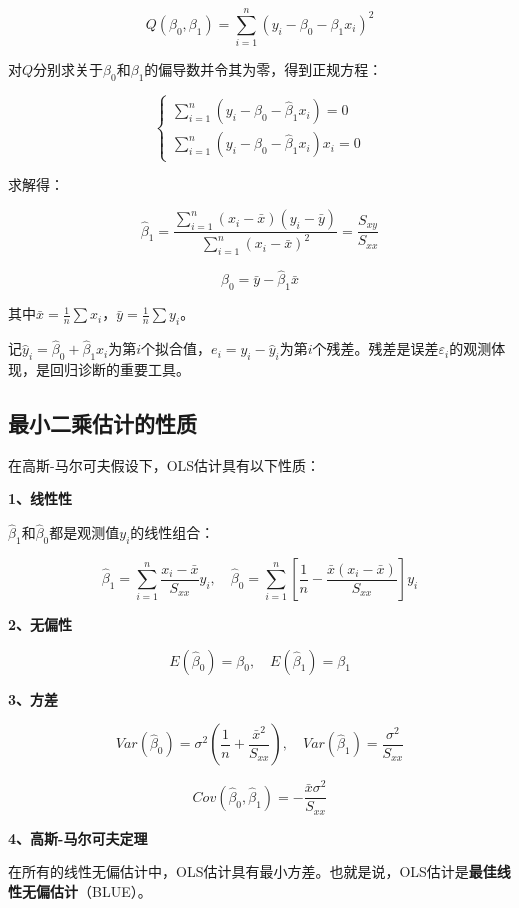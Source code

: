 \documentclass[
]{book}
\begin{document}
\[
Q(\beta_0, \beta_1) = \sum_{i=1}^n (y_i - \beta_0 - \beta_1 x_i)^2
\]

对\(Q\)分别求关于\(\beta_0\)和\(\beta_1\)的偏导数并令其为零，得到正规方程：

\[
\begin{cases}
\sum_{i=1}^n (y_i - \hat{\beta}_0 - \hat{\beta}_1 x_i) = 0 \\
\sum_{i=1}^n (y_i - \hat{\beta}_0 - \hat{\beta}_1 x_i) x_i = 0
\end{cases}
\]

求解得：

\[
\hat{\beta}_1 = \frac{\sum_{i=1}^n (x_i - \bar{x})(y_i - \bar{y})}{\sum_{i=1}^n (x_i - \bar{x})^2} = \frac{S_{xy}}{S_{xx}}
\]

\[
\hat{\beta}_0 = \bar{y} - \hat{\beta}_1 \bar{x}
\]

其中\(\bar{x} = \frac{1}{n}\sum x_i\)，\(\bar{y} = \frac{1}{n}\sum y_i\)。

记\(\hat{y}_i = \hat{\beta}_0 + \hat{\beta}_1 x_i\)为第\(i\)个拟合值，\(e_i = y_i - \hat{y}_i\)为第\(i\)个残差。残差是误差\(\varepsilon_i\)的观测体现，是回归诊断的重要工具。

\subsection{最小二乘估计的性质}\label{ux6700ux5c0fux4e8cux4e58ux4f30ux8ba1ux7684ux6027ux8d28}

在高斯-马尔可夫假设下，OLS估计具有以下性质：

\textbf{1、线性性}

\(\hat{\beta}_1\)和\(\hat{\beta}_0\)都是观测值\(y_i\)的线性组合：

\[
\hat{\beta}_1 = \sum_{i=1}^n \frac{x_i - \bar{x}}{S_{xx}} y_i, \quad \hat{\beta}_0 = \sum_{i=1}^n \left[\frac{1}{n} - \frac{\bar{x}(x_i - \bar{x})}{S_{xx}}\right] y_i
\]

\textbf{2、无偏性}

\[
E(\hat{\beta}_0) = \beta_0, \quad E(\hat{\beta}_1) = \beta_1
\]

\textbf{3、方差}

\[
Var(\hat{\beta}_0) = \sigma^2 \left(\frac{1}{n} + \frac{\bar{x}^2}{S_{xx}}\right), \quad Var(\hat{\beta}_1) = \frac{\sigma^2}{S_{xx}}
\]

\[
Cov(\hat{\beta}_0, \hat{\beta}_1) = -\frac{\bar{x} \sigma^2}{S_{xx}}
\]

\textbf{4、高斯-马尔可夫定理}

在所有的线性无偏估计中，OLS估计具有最小方差。也就是说，OLS估计是\textbf{最佳线性无偏估计}（BLUE）。
\end{document}
